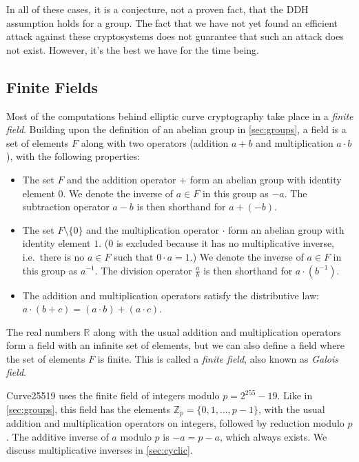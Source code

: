 \documentclass{article}
\begin{document}
In all of these cases, it is a conjecture, not a proven fact, that the DDH assumption holds for a group.
The fact that we have not yet found an efficient attack against these cryptosystems does not guarantee that such an attack does not exist.
However, it's the best we have for the time being.


\subsection{Finite Fields}\label{sec:fields}

Most of the computations behind elliptic curve cryptography take place in a \emph{finite field}.
Building upon the definition of an abelian group in \autoref{sec:groups}, a field is a set of elements $F$ along with two operators (addition $a + b$ and multiplication $a \cdot b$), with the following properties:
\begin{itemize}
    \item The set $F$ and the addition operator $+$ form an abelian group with identity element $0$.
        We denote the inverse of $a \in F$ in this group as $-a$.
        The subtraction operator $a - b$ is then shorthand for $a + (-b)$.
    \item The set $F \setminus \{0\}$ and the multiplication operator $\cdot$ form an abelian group with identity element $1$.
        (0 is excluded because it has no multiplicative inverse, i.e.\ there is no $a \in F$ such that $0 \cdot a = 1$.)
        We denote the inverse of $a \in F$ in this group as $a^{-1}$.
        The division operator $\frac{a}{b}$ is then shorthand for $a \cdot (b^{-1})$.
    \item The addition and multiplication operators satisfy the distributive law: $a \cdot (b + c) = (a \cdot b) + (a \cdot c)$.
\end{itemize}
The real numbers $\mathbb{R}$ along with the usual addition and multiplication operators form a field with an infinite set of elements, but we can also define a field where the set of elements $F$ is finite.
This is called a \emph{finite field}, also known as \emph{Galois field}.

Curve25519 uses the finite field of integers modulo $p = 2^{255}-19$.
Like in \autoref{sec:groups}, this field has the elements $\mathbb{Z}_p = \{0, 1, \dots, p-1\}$, with the usual addition and multiplication operators on integers, followed by reduction modulo $p$.
The additive inverse of $a$ modulo $p$ is $-a = p - a$, which always exists.
We discuss multiplicative inverses in \autoref{sec:cyclic}.
\end{document}
